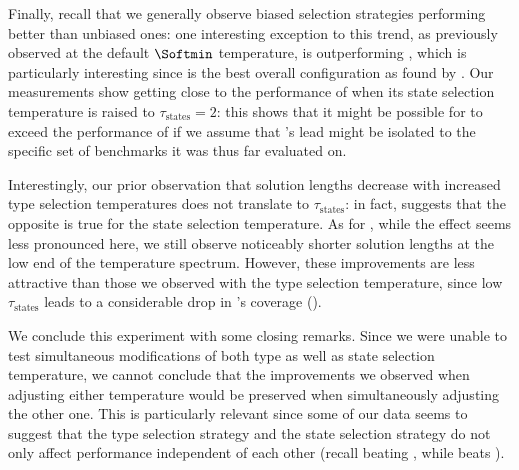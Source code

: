 Finally, recall that we generally observe biased selection strategies performing better than unbiased ones: one interesting exception to this trend, as previously observed at the default $\Softmin$ temperature, is \hiDu outperforming \hiDh, which is particularly interesting since \hiDu is the best overall configuration as found by . Our measurements show \hiDh getting close to the performance of \hiDu when its state selection temperature is raised to $\tau_\text{states}=2$: this shows that it might be possible for \hiDh to exceed the performance of \hiDu if we assume that \hiDu's lead might be isolated to the specific set of benchmarks it was thus far evaluated on.

Interestingly, our prior observation that solution lengths decrease with increased type selection temperatures does not translate to $\tau_\text{states}$: in fact,  suggests that the opposite is true for the state selection temperature. As for \hiDh, while the effect seems less pronounced here, we still observe noticeably shorter solution lengths at the low end of the temperature spectrum. However, these improvements are less attractive than those we observed with the type selection temperature, since low $\tau_\text{states}$ leads to a considerable drop in \hiDh's coverage ().

We conclude this experiment with some closing remarks. Since we were unable to test simultaneous modifications of both type as well as state selection temperature, we cannot conclude that the improvements we observed when adjusting either temperature would be preserved when simultaneously adjusting the other one. This is particularly relevant since some of our data seems to suggest that the type selection strategy and the state selection strategy do not only affect performance independent of each other (recall \hiDu beating \hiDh, while \hiHh beats \hiHu).

